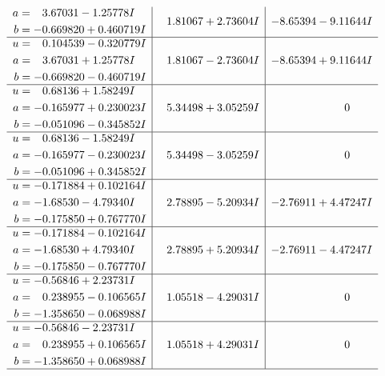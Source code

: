 \documentclass[1p]{elsarticle_modified}
\theoremstyle{definition}
\begin{document}
$$\begin{array}{c|c|c}
\begin{aligned}
a &= \phantom{-}3.67031 - 1.25778 I \\
b &= -0.669820 + 0.460719 I\end{aligned}
 & \phantom{-}1.81067 + 2.73604 I & -8.65394 - 9.11644 I \\ \hline\begin{aligned}
u &= \phantom{-}0.104539 - 0.320779 I \\
a &= \phantom{-}3.67031 + 1.25778 I \\
b &= -0.669820 - 0.460719 I\end{aligned}
 & \phantom{-}1.81067 - 2.73604 I & -8.65394 + 9.11644 I \\ \hline\begin{aligned}
u &= \phantom{-}0.68136 + 1.58249 I \\
a &= -0.165977 + 0.230023 I \\
b &= -0.051096 - 0.345852 I\end{aligned}
 & \phantom{-}5.34498 + 3.05259 I & \phantom{-0.000000 } 0 \\ \hline\begin{aligned}
u &= \phantom{-}0.68136 - 1.58249 I \\
a &= -0.165977 - 0.230023 I \\
b &= -0.051096 + 0.345852 I\end{aligned}
 & \phantom{-}5.34498 - 3.05259 I & \phantom{-0.000000 } 0 \\ \hline\begin{aligned}
u &= -0.171884 + 0.102164 I \\
a &= -1.68530 - 4.79340 I \\
b &= -0.175850 + 0.767770 I\end{aligned}
 & \phantom{-}2.78895 - 5.20934 I & -2.76911 + 4.47247 I \\ \hline\begin{aligned}
u &= -0.171884 - 0.102164 I \\
a &= -1.68530 + 4.79340 I \\
b &= -0.175850 - 0.767770 I\end{aligned}
 & \phantom{-}2.78895 + 5.20934 I & -2.76911 - 4.47247 I \\ \hline\begin{aligned}
u &= -0.56846 + 2.23731 I \\
a &= \phantom{-}0.238955 - 0.106565 I \\
b &= -1.358650 - 0.068988 I\end{aligned}
 & \phantom{-}1.05518 - 4.29031 I & \phantom{-0.000000 } 0 \\ \hline\begin{aligned}
u &= -0.56846 - 2.23731 I \\
a &= \phantom{-}0.238955 + 0.106565 I \\
b &= -1.358650 + 0.068988 I\end{aligned}
 & \phantom{-}1.05518 + 4.29031 I & \phantom{-0.000000 } 0\\
 \hline 
 \end{array}$$\newpage\newpage\renewcommand{\arraystretch}{1}
\end{document}
